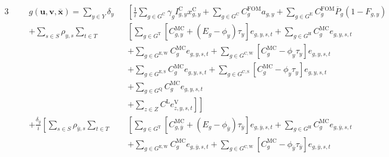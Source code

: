 \documentclass{article}
\newcommand{\sGeneratorsExisting}{G^{\mathrm{E}}}
\newcommand{\sGeneratorsExistingWind}{G^{\mathrm{E,W}}}
\newcommand{\sGeneratorsExistingSolar}{G^{\mathrm{E,S}}}
\newcommand{\sGeneratorsCandidate}{G^{\mathrm{C}}}
\newcommand{\sGeneratorsCandidateWind}{G^{\mathrm{C,W}}}
\newcommand{\sGeneratorsCandidateSolar}{G^{\mathrm{C,S}}}
\newcommand{\sGeneratorsThermal}{G^{\mathrm{T}}}
\newcommand{\sGeneratorsHydro}{G^{\mathrm{H}}}
\newcommand{\sStorage}{G^{\mathrm{Q}}}
\newcommand{\sYears}{Y}
\newcommand{\sScenarios}{S}
\newcommand{\sIntervals}{T}
\newcommand{\sZones}{Z}
\newcommand{\iGenerator}{g}
\newcommand{\iYear}{y}
\newcommand{\iYearTerminal}{\overline{\iYear}}
\newcommand{\iScenario}{s}
\newcommand{\iInterval}{t}
\newcommand{\iZone}{z}
\newcommand{\cFixedOperationsMaintenanceCostGenerator}[1][\iGenerator]{C^{\mathrm{FOM}}_{#1}}
\newcommand{\cScenarioDuration}[1][\iYear,\iScenario]{\rho_{#1}}
\newcommand{\cMarginalCost}[1][\iGenerator,\iYear]{C^{\mathrm{MC}}_{#1}}
\newcommand{\cEmissionsIntensity}[1][\iGenerator]{E_{#1}}
\newcommand{\cPowerOutputMax}[1][\iGenerator,\iYear]{\overline{P}_{#1}}
\newcommand{\cAmortisationRate}[1][\iGenerator]{\gamma_{#1}}
\newcommand{\cCandidateInvestmentCost}[1][\iGenerator,\iYear]{I^{\mathrm{C}}_{#1}}
\newcommand{\cInterestRate}{i}
\newcommand{\cLostLoadCost}{C^{\mathrm{L}}}
\newcommand{\cRetirementIndicator}[1][\iGenerator,\iYear]{F_{#1}}
\newcommand{\cDiscountRate}[1][\iYear]{\delta_{#1}}
\newcommand{\vBaseline}[1][\iYear]{\phi_{#1}}
\newcommand{\vPermitPrice}[1][\iYear]{\tau_{#1}}
\newcommand{\vEnergy}[1][\iGenerator,\iYear,\iScenario,\iInterval]{e_{#1}}
\newcommand{\vInstalledCapacity}[1][\iGenerator,\iYear]{x^{\mathrm{C}}_{#1}}
\newcommand{\vLostLoadEnergy}[1][\iZone,\iYear,\iScenario,\iInterval]{e^{\mathrm{V}}_{#1}}
\newcommand{\vInstalledCapacityTotal}[1][\iGenerator,\iYear]{a_{#1}}
\begin{document}
\begin{alignat}{3}
	& && g(\bm{u}, \bm{v}, \overline{\bm{x}}) = \sum\limits_{\iYear \in \sYears} \cDiscountRate  &&  \left[\frac{1}{\cInterestRate} \sum\limits_{g\in \sGeneratorsCandidate} \cAmortisationRate  \cCandidateInvestmentCost \vInstalledCapacity + \sum\limits_{\iGenerator \in \sGeneratorsCandidate} \cFixedOperationsMaintenanceCostGenerator \vInstalledCapacityTotal + \sum\limits_{\iGenerator \in \sGeneratorsExisting} \cFixedOperationsMaintenanceCostGenerator \cPowerOutputMax[\iGenerator] \left(1 - \cRetirementIndicator\right) \right. \nonumber\\ 
	& && + \sum\limits_{\iScenario \in \sScenarios} \cScenarioDuration \sum\limits_{\iInterval \in \sIntervals} && \left[\sum\limits_{\iGenerator \in \sGeneratorsThermal} \left[\cMarginalCost + (\cEmissionsIntensity - \vBaseline)\vPermitPrice\right]\vEnergy  + \sum\limits_{\iGenerator \in \sGeneratorsHydro}\cMarginalCost[\iGenerator] \vEnergy \right. \nonumber\\
	& && && + \sum\limits_{\iGenerator \in \sGeneratorsExistingWind} \cMarginalCost[\iGenerator] \vEnergy + \sum\limits_{\iGenerator \in \sGeneratorsCandidateWind} \left[\cMarginalCost[\iGenerator] - \vBaseline \vPermitPrice\right] \vEnergy \nonumber\\
	& && && + \sum\limits_{\iGenerator \in \sGeneratorsExistingSolar} \cMarginalCost[\iGenerator] \vEnergy + \sum\limits_{\iGenerator \in \sGeneratorsCandidateSolar} \left[\cMarginalCost[\iGenerator] - \vBaseline\vPermitPrice\right] \vEnergy \nonumber\\
	& && && + \sum\limits_{\iGenerator \in \sStorage} \cMarginalCost[\iGenerator] \vEnergy \nonumber\\
	& && && \left.\left. + \sum\limits_{\iZone \in \sZones} \cLostLoadCost \vLostLoadEnergy \right]\right] \nonumber\\
	& && + \frac{\cDiscountRate[\iYearTerminal]}{\cInterestRate} \left[\sum\limits_{\iScenario \in \sScenarios}  \cScenarioDuration[\iYearTerminal,\iScenario] \sum\limits_{\iInterval \in \sIntervals} \right. && \left[\sum\limits_{\iGenerator \in \sGeneratorsThermal} \left[\cMarginalCost[\iGenerator,\iYearTerminal] + (\cEmissionsIntensity - \vBaseline[\iYearTerminal])\vPermitPrice[\iYearTerminal]\right]\vEnergy[\iGenerator,\iYearTerminal,\iScenario,\iInterval]  + \sum\limits_{\iGenerator \in \sGeneratorsHydro}\cMarginalCost[\iGenerator] \vEnergy[\iGenerator,\iYearTerminal,\iScenario,\iInterval] \right. \nonumber\\
	& && && + \sum\limits_{\iGenerator \in \sGeneratorsExistingWind} \cMarginalCost[\iGenerator] \vEnergy[\iGenerator,\iYearTerminal,\iScenario,\iInterval] + \sum\limits_{\iGenerator \in \sGeneratorsCandidateWind} \left[\cMarginalCost[\iGenerator] - \vBaseline[\iYearTerminal] \vPermitPrice[\iYearTerminal]\right] \vEnergy[\iGenerator,\iYearTerminal,\iScenario,\iInterval] \nonumber\\

\end{alignat}
\end{document}
